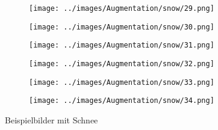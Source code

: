\begin{figure}[H]
\begin{subfigure}[b]{0.1\textwidth}
\centering
\texttt{[image: ../images/Augmentation/snow/29.png]}
\end{subfigure}
\hspace{1em}%
\begin{subfigure}[b]{0.1\textwidth}
\centering
\texttt{[image: ../images/Augmentation/snow/30.png]}
\end{subfigure}
\hspace{1em}%
\begin{subfigure}[b]{0.1\textwidth}
\centering
\texttt{[image: ../images/Augmentation/snow/31.png]}
\end{subfigure}
\hspace{1em}%
\begin{subfigure}[b]{0.1\textwidth}
\centering
\texttt{[image: ../images/Augmentation/snow/32.png]}
\end{subfigure}
\hspace{1em}%
\begin{subfigure}[b]{0.1\textwidth}
\centering
\texttt{[image: ../images/Augmentation/snow/33.png]}
\end{subfigure}
\hspace{1em}%
\begin{subfigure}[b]{0.1\textwidth}
\centering
\texttt{[image: ../images/Augmentation/snow/34.png]}
\end{subfigure}
\caption{Beispielbilder mit Schnee}
\label{fig:snow-imgs}
\end{figure}

